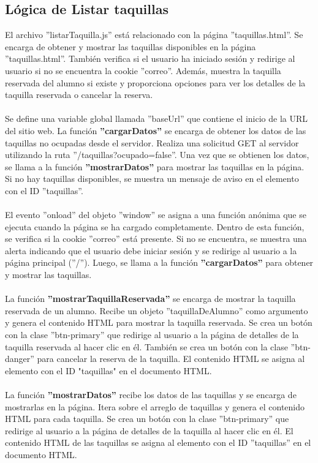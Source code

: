 \documentclass[12pt]{report}
\begin{document}
\subsection{Lógica de Listar taquillas}
El archivo ''listarTaquilla.js'' está relacionado con la página ''taquillas.html''. Se encarga de obtener y mostrar las taquillas disponibles en la página ''taquillas.html''. También verifica si el usuario ha iniciado sesión y redirige al usuario si no se encuentra la cookie ''correo''. Además, muestra la taquilla reservada del alumno si existe y proporciona opciones para ver los detalles de la taquilla reservada o cancelar la reserva.\\\\
Se define una variable global llamada ''baseUrl'' que contiene el inicio de la URL del sitio web. La función \textbf{''cargarDatos''} se encarga de obtener los datos de las taquillas no ocupadas desde el servidor. Realiza una solicitud GET al servidor utilizando la ruta ''/taquillas?ocupado=false''. Una vez que se obtienen los datos, se llama a la función \textbf{''mostrarDatos''} para mostrar las taquillas en la página. Si no hay taquillas disponibles, se muestra un mensaje de aviso en el elemento con el ID ''taquillas''.
\\\\
El evento ''onload'' del objeto ''window'' se asigna a una función anónima que se ejecuta cuando la página se ha cargado completamente. Dentro de esta función, se verifica si la cookie ''correo'' está presente. Si no se encuentra, se muestra una alerta indicando que el usuario debe iniciar sesión y se redirige al usuario a la página principal (''/''). Luego, se llama a la función \textbf{''cargarDatos''} para obtener y mostrar las taquillas.
\\\\
La función \textbf{''mostrarTaquillaReservada''} se encarga de mostrar la taquilla reservada de un alumno. Recibe un objeto ''taquillaDeAlumno'' como argumento y genera el contenido HTML para mostrar la taquilla reservada. Se crea un botón con la clase ''btn-primary'' que redirige al usuario a la página de detalles de la taquilla reservada al hacer clic en él. También se crea un botón con la clase ''btn-danger'' para cancelar la reserva de la taquilla. El contenido HTML se asigna al elemento con el ID "taquillas" en el documento HTML.
\\\\
La función \textbf{''mostrarDatos''} recibe los datos de las taquillas y se encarga de mostrarlas en la página. Itera sobre el arreglo de taquillas y genera el contenido HTML para cada taquilla. Se crea un botón con la clase ''btn-primary'' que redirige al usuario a la página de detalles de la taquilla al hacer clic en él. El contenido HTML de las taquillas se asigna al elemento con el ID ''taquillas'' en el documento HTML.
\end{document}
